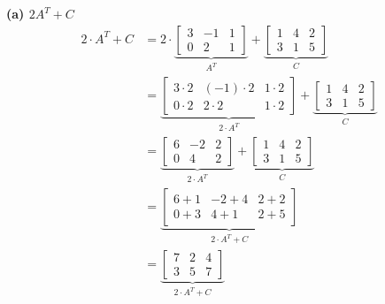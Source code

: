 \documentclass[a4paper,12pt]{article}
\begin{document}
\textbf{(a) $2A^{T} + C$}
\begin{align*}
2 \cdot A^{T} + C&=
    2 \cdot
    \underbrace{
    \begin{bmatrix}
        3 & -1 & 1\\
        0 & 2 & 1
    \end{bmatrix}}_{A^{T}} 
    +
    \underbrace{
    \begin{bmatrix}
        1 & 4 & 2 \\
        3 & 1 & 5
    \end{bmatrix}}_{C} \\
    &=
    \underbrace{
    \begin{bmatrix}
        3 \cdot 2 & (-1) \cdot 2 & 1 \cdot 2\\
        0 \cdot 2 & 2 \cdot 2 & 1 \cdot 2
    \end{bmatrix}}_{2 \cdot A^{T}}
    +
    \underbrace{
    \begin{bmatrix}
        1 & 4 & 2 \\
        3 & 1 & 5
    \end{bmatrix}}_{C} \\
    &=
    \underbrace{
    \begin{bmatrix}
        6 & -2 & 2\\
        0 & 4 & 2
    \end{bmatrix}}_{2 \cdot A^{T}}
    +
    \underbrace{
    \begin{bmatrix}
        1 & 4 & 2 \\
        3 & 1 & 5
    \end{bmatrix}}_{C} \\
    &=
    \underbrace{
    \begin{bmatrix}
        6 + 1 & -2 + 4 & 2 + 2\\
        0 + 3 & 4 + 1 & 2 + 5
    \end{bmatrix}}_{2 \cdot A^{T} + C} \\
    &=
    \underbrace{
    \begin{bmatrix}
        7 & 2 & 4\\
        3 & 5 & 7
    \end{bmatrix}}_{2 \cdot A^{T} + C}
\end{align*}
\end{document}
